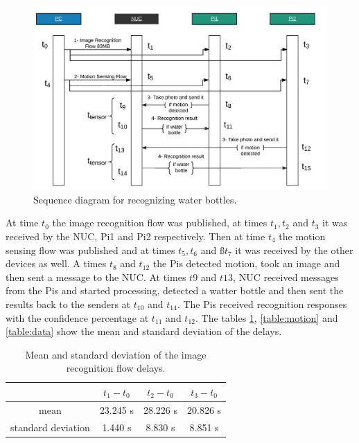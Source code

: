 \begin{figure}[H]
	\centering
	\includegraphics[scale=0.45]{images/sequence-diagram.png}
	\caption{Sequence diagram for recognizing water bottles.}
	\label{fig:sd-tensor}
\end{figure} 
 


\noindent At time $t_0$ the image recognition flow was published, at times $t_1, t_2$ and   $t_3$ it was received by the NUC, Pi1 and Pi2 respectively. Then at time $t_4$ the motion sensing flow was published and at times $t_5,t_6$ and $ßt_7$ it was received by the other devices as well. A times $t_8$ and $t_{12}$  the Pis detected motion, took an image and then sent a message to the NUC. At times $t9$ and $t{13}$,  NUC received messages from the Pis and started processing, detected a watter bottle and then sent the  results back to the senders at $t_{10}$ and $t_{14}$. The Pis received recognition responses with the confidence percentage at $t_{11}$ and $t_{12}$.  The tables \ref{table:tensor}, \ref{table:motion} and \ref{table:data} show the mean and standard deviation of the delays.  
\begin{table}[H]
\centering
\begin{tabular}{c|c|c|c}\toprule
&$t_1 - t_0$  & $t_2 - t_0$  & $t_3-t_0$ \\ \midrule
mean&	23.245 s&28.226 s&20.826 s\\ 
standard deviation &1.440 s&8.830 s&8.851 s\\
\end{tabular}
\caption{Mean and standard deviation of the image recognition flow delays.}
\label{table:tensor}
\end{table}


